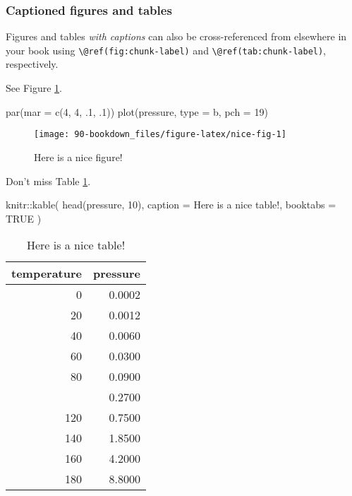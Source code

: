 \documentclass[
]{bxjsbook}
\newenvironment{Shaded}{\begin{snugshade}}{\end{snugshade}}
\newcommand{\AttributeTok}[1]{\textcolor[rgb]{0.77,0.63,0.00}{#1}}
\newcommand{\ConstantTok}[1]{\textcolor[rgb]{0.00,0.00,0.00}{#1}}
\newcommand{\DecValTok}[1]{\textcolor[rgb]{0.00,0.00,0.81}{#1}}
\newcommand{\FunctionTok}[1]{\textcolor[rgb]{0.00,0.00,0.00}{#1}}
\newcommand{\NormalTok}[1]{#1}
\newcommand{\SpecialCharTok}[1]{\textcolor[rgb]{0.00,0.00,0.00}{#1}}
\newcommand{\StringTok}[1]{\textcolor[rgb]{0.31,0.60,0.02}{#1}}
\theoremstyle{definition}
\theoremstyle{definition}
\theoremstyle{definition}
\theoremstyle{definition}
\theoremstyle{remark}
\begin{document}
\hypertarget{captioned-figures-and-tables}{%
\subsubsection{Captioned figures and tables}\label{captioned-figures-and-tables}}

Figures and tables \emph{with captions} can also be cross-referenced from elsewhere in your book using \texttt{\textbackslash{}@ref(fig:chunk-label)} and \texttt{\textbackslash{}@ref(tab:chunk-label)}, respectively.

See Figure \ref{fig:nice-fig}.

\begin{Shaded}
\begin{Highlighting}[]
\FunctionTok{par}\NormalTok{(}\AttributeTok{mar =} \FunctionTok{c}\NormalTok{(}\DecValTok{4}\NormalTok{, }\DecValTok{4}\NormalTok{, .}\DecValTok{1}\NormalTok{, .}\DecValTok{1}\NormalTok{))}
\FunctionTok{plot}\NormalTok{(pressure, }\AttributeTok{type =} \StringTok{\textquotesingle{}b\textquotesingle{}}\NormalTok{, }\AttributeTok{pch =} \DecValTok{19}\NormalTok{)}
\end{Highlighting}
\end{Shaded}

\begin{figure}

{\centering \texttt{[image: 90-bookdown\_files/figure-latex/nice-fig-1]} 

}

\caption{Here is a nice figure!}\label{fig:nice-fig}
\end{figure}

Don't miss Table \ref{tab:nice-tab}.

\begin{Shaded}
\begin{Highlighting}[]
\NormalTok{knitr}\SpecialCharTok{::}\FunctionTok{kable}\NormalTok{(}
  \FunctionTok{head}\NormalTok{(pressure, }\DecValTok{10}\NormalTok{), }\AttributeTok{caption =} \StringTok{\textquotesingle{}Here is a nice table!\textquotesingle{}}\NormalTok{,}
  \AttributeTok{booktabs =} \ConstantTok{TRUE}
\NormalTok{)}
\end{Highlighting}
\end{Shaded}

\begin{table}

\caption{\label{tab:nice-tab}Here is a nice table!}
\centering
\begin{tabular}[t]{rr}
\toprule
temperature & pressure\\
\midrule
0 & 0.0002\\
20 & 0.0012\\
40 & 0.0060\\
60 & 0.0300\\
80 & 0.0900\\
\addlinespace
100 & 0.2700\\
120 & 0.7500\\
140 & 1.8500\\
160 & 4.2000\\
180 & 8.8000\\
\bottomrule
\end{tabular}
\end{table}
\end{document}

